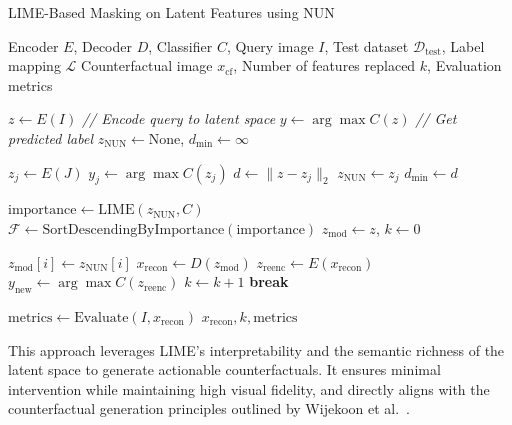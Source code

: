 \begin{algorithm}[htbp]
\caption{LIME-Based Masking on Latent Features using NUN}
\label{alg:nun_lime}
\begin{algorithmic}[1]
\REQUIRE Encoder $E$, Decoder $D$, Classifier $C$, Query image $I$, Test dataset $\mathcal{D}_{\text{test}}$, Label mapping $\mathcal{L}$
\ENSURE Counterfactual image $x_{\text{cf}}$, Number of features replaced $k$, Evaluation metrics

\STATE $z \leftarrow E(I)$ \hfill \textit{// Encode query to latent space}
\STATE $y \leftarrow \arg\max C(z)$ \hfill \textit{// Get predicted label}
\STATE $z_{\text{NUN}} \leftarrow \text{None}$, $d_{\min} \leftarrow \infty$

    \STATE $z_j \leftarrow E(J)$
    \STATE $y_j \leftarrow \arg\max C(z_j)$
        \STATE $d \leftarrow \|z - z_j\|_2$
            \STATE $z_{\text{NUN}} \leftarrow z_j$
            \STATE $d_{\min} \leftarrow d$
        \ENDIF
    \ENDIF
\ENDFOR

\STATE $\text{importance} \leftarrow \text{LIME}(z_{\text{NUN}}, C)$
\STATE $\mathcal{F} \leftarrow \text{SortDescendingByImportance}(\text{importance})$
\STATE $z_{\text{mod}} \leftarrow z$, $k \leftarrow 0$

    \STATE $z_{\text{mod}}[i] \leftarrow z_{\text{NUN}}[i]$
    \STATE $x_{\text{recon}} \leftarrow D(z_{\text{mod}})$
    \STATE $z_{\text{reenc}} \leftarrow E(x_{\text{recon}})$
    \STATE $y_{\text{new}} \leftarrow \arg\max C(z_{\text{reenc}})$
    \STATE $k \leftarrow k + 1$
        \STATE \textbf{break}
    \ENDIF
\ENDFOR

\STATE $\text{metrics} \leftarrow \text{Evaluate}(I, x_{\text{recon}})$
\RETURN $x_{\text{recon}}, k, \text{metrics}$
\end{algorithmic}
\end{algorithm}


This approach leverages LIME’s interpretability and the semantic richness of the latent space to generate actionable counterfactuals. It ensures minimal intervention while maintaining high visual fidelity, and directly aligns with the counterfactual generation principles outlined by Wijekoon et al.~\cite{WijekoonWNMPC21}.







